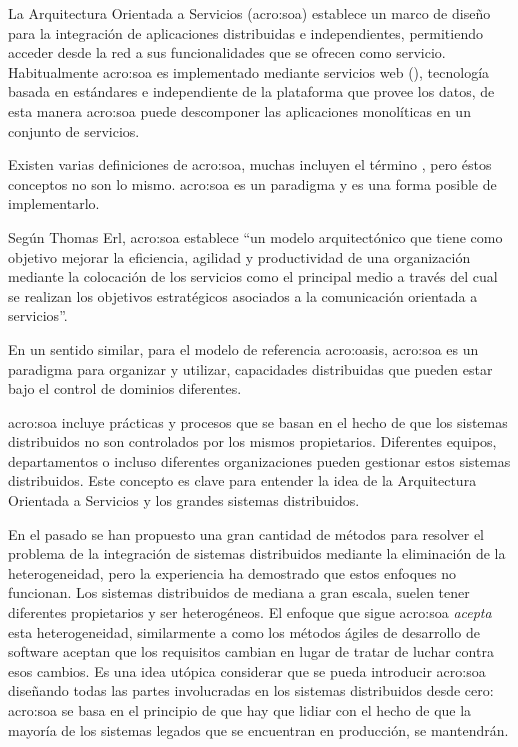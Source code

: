 La Arquitectura Orientada a Servicios (\gls{acro:soa}) establece un marco de diseño para la integración de aplicaciones distribuidas e independientes, permitiendo acceder desde la red a sus funcionalidades que se ofrecen como servicio. Habitualmente \gls{acro:soa} es implementado mediante servicios web (), tecnología basada en estándares e independiente de la plataforma que provee los datos, de esta manera \gls{acro:soa} puede descomponer las aplicaciones monolíticas en un conjunto de servicios\cite{microsoft2006}.

Existen varias definiciones de \gls{acro:soa}, muchas incluyen el término , pero éstos conceptos no son lo mismo. \gls{acro:soa} es un paradigma y  es una forma posible de implementarlo.

Según Thomas Erl\cite{principlesofdesign:erl}, \gls{acro:soa} establece ``un modelo arquitectónico que tiene como objetivo mejorar la eficiencia, agilidad y productividad de una organización mediante la colocación de los servicios como el principal medio a través del cual se realizan los objetivos estratégicos asociados a la comunicación orientada a servicios''.

En un sentido similar, para el modelo de referencia \gls{acro:oasis}, \gls{acro:soa} es un paradigma para organizar y utilizar, capacidades distribuidas que pueden estar bajo el control de dominios diferentes.

\gls{acro:soa} incluye prácticas y procesos que se basan en el hecho de que los sistemas distribuidos no son controlados por los mismos propietarios. Diferentes equipos, departamentos o incluso diferentes organizaciones pueden gestionar estos sistemas distribuidos. Este concepto es clave para entender la idea de la Arquitectura Orientada a Servicios y los grandes sistemas distribuidos.

En el pasado se han propuesto una gran cantidad de métodos para resolver el problema de la integración de sistemas distribuidos mediante la eliminación de la heterogeneidad, pero la experiencia ha demostrado que estos enfoques no funcionan.\cite[p.~14]{josuttis2007} Los sistemas distribuidos de mediana a gran escala, suelen tener diferentes propietarios y ser heterogéneos. El enfoque que sigue \gls{acro:soa} \textit{acepta} esta heterogeneidad, similarmente a como los métodos ágiles de desarrollo de software aceptan que los requisitos cambian en lugar de tratar de luchar contra esos cambios. Es una idea utópica considerar que se pueda introducir \gls{acro:soa} diseñando todas las partes involucradas en los sistemas distribuidos desde cero: \gls{acro:soa} se basa en el principio de que hay que lidiar con el hecho de que la mayoría de los sistemas legados que se encuentran en producción, se mantendrán.\cite[p.~15]{josuttis2007}

